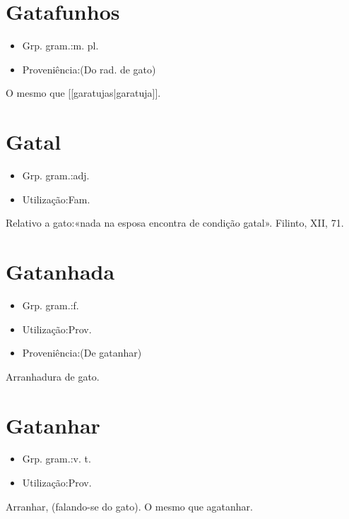 \section{Gatafunhos}
\begin{itemize}
\item {Grp. gram.:m. pl.}
\end{itemize}
\begin{itemize}
\item {Proveniência:(Do rad. de \textunderscore gato\textunderscore )}
\end{itemize}
O mesmo que [[garatujas|garatuja]].
\section{Gatal}
\begin{itemize}
\item {Grp. gram.:adj.}
\end{itemize}
\begin{itemize}
\item {Utilização:Fam.}
\end{itemize}
Relativo a gato:«\textunderscore nada na esposa encontra de condição gatal\textunderscore ». Filinto, XII, 71.
\section{Gatanhada}
\begin{itemize}
\item {Grp. gram.:f.}
\end{itemize}
\begin{itemize}
\item {Utilização:Prov.}
\end{itemize}
\begin{itemize}
\item {Proveniência:(De \textunderscore gatanhar\textunderscore )}
\end{itemize}
Arranhadura de gato.
\section{Gatanhar}
\begin{itemize}
\item {Grp. gram.:v. t.}
\end{itemize}
\begin{itemize}
\item {Utilização:Prov.}
\end{itemize}
Arranhar, (falando-se do gato).
O mesmo que \textunderscore agatanhar\textunderscore .
